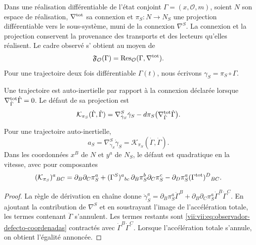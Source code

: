 Dans une réalisation différentiable de l'état conjoint
\(\Gamma=(x,\mathcal O,m)\), soient \(N\) son espace de réalisation,
\(\nabla^{\rm tot}\) sa connexion et \(\pi_S:N\to N_S\) une
projection différentiable vers le sous-système, muni de la connexion
\(\nabla^S\). La connexion et la projection conservent la provenance
des transports et des lecteurs qu'elles réalisent. Le cadre observé s'
obtient au moyen de
\[
 \mathfrak F_{\mathcal O}(\Gamma)
 =\operatorname{Res}_{\mathcal O}(\Gamma,\nabla^{\rm tot}).
\]
Pour une trajectoire deux fois différentiable \(\Gamma(t)\),
nous écrivons \(\gamma_S=\pi_S\circ\Gamma\).

\begin{definition}
\label{vii:vii:def:observador-autoinercia}
Une trajectoire est auto-inertielle par rapport à la connexion déclarée
lorsque \(\nabla^{\rm tot}_{\dot\Gamma}\dot\Gamma=0\).
Le défaut de sa projection est
\begin{equation}
 \mathcal K_{\pi_S}(\dot\Gamma,\dot\Gamma)
 =\nabla^S_{\dot\gamma_S}\dot\gamma_S
  -d\pi_S\bigl(\nabla^{\rm tot}_{\dot\Gamma}\dot\Gamma\bigr).
 \label{vii:vii:eq:observador-defecto-proyeccion}
\end{equation}
\end{definition}

\begin{proposition}
\label{vii:vii:prop:observador-aceleracion}
Pour une trajectoire auto-inertielle,
\[
 a_S=\nabla^S_{\dot\gamma_S}\dot\gamma_S
     =\mathcal K_{\pi_S}(\dot\Gamma,\dot\Gamma).
\]
Dans les coordonnées \(x^B\) de \(N\) et \(y^a\) de \(N_S\), le
défaut est quadratique en la vitesse, avec pour composantes
\begin{equation}
 (\mathcal K_{\pi_S})^a{}_{BC}
 =\partial_B\partial_C\pi_S^a
  +(\Gamma^S)^a{}_{bc}\,
        \partial_B\pi_S^b\partial_C\pi_S^c
  -\partial_D\pi_S^a(\Gamma^{\rm tot})^D{}_{BC}.
 \label{vii:vii:eq:observador-defecto-coordenadas}
\end{equation}
\end{proposition}

\begin{proof}
La règle de dérivation en chaîne donne \(\ddot\gamma_S^a=\partial_B\pi_S^a\ddot\Gamma^B
 +\partial_B\partial_C\pi_S^a\dot\Gamma^B\dot\Gamma^C\). En ajoutant la contribution de \(\nabla^S\) et en soustrayant l'image de l'accélération totale, les termes contenant \(\ddot\Gamma\) s'annulent. Les termes restants sont \eqref{vii:vii:eq:observador-defecto-coordenadas} contractés avec \(\dot\Gamma^B\dot\Gamma^C\). Lorsque l'accélération totale s'annule, on obtient l'égalité annoncée.
\end{proof}

